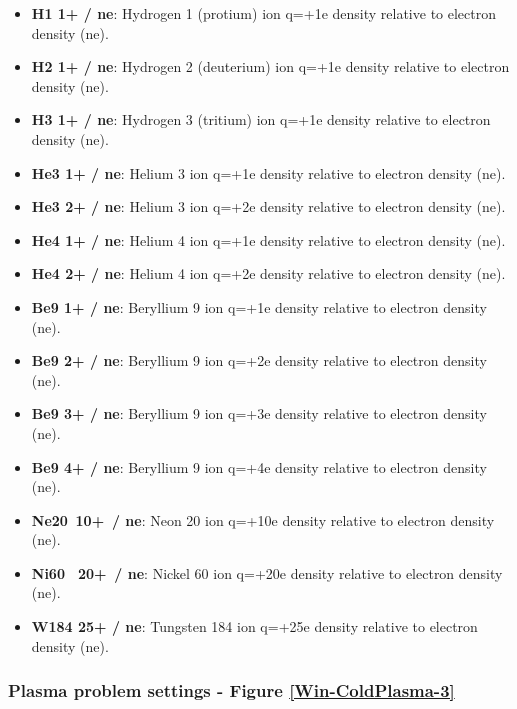 \begin{itemize}\itemsep0em 
	\item \textbf{H1 1+ / ne}: Hydrogen 1 (protium) ion q=+1e density relative to electron density (ne).
	\item \textbf{H2 1+ / ne}: Hydrogen 2 (deuterium) ion q=+1e density relative to electron density (ne).
	\item \textbf{H3 1+ / ne}: Hydrogen 3 (tritium) ion q=+1e density relative to electron density (ne).
	\\
	\item \textbf{He3 1+ / ne}: Helium 3 ion q=+1e density relative to electron density (ne).
    \item \textbf{He3 2+ / ne}: Helium 3 ion q=+2e density relative to electron density (ne).
    \\
    \item \textbf{He4 1+ / ne}: Helium 4 ion q=+1e density relative to electron density (ne).
    \item \textbf{He4 2+ / ne}: Helium 4 ion q=+2e density relative to electron density (ne).
    \\
	\item \textbf{Be9 1+ / ne}: Beryllium 9 ion q=+1e density relative to electron density (ne).
    \item \textbf{Be9 2+ / ne}: Beryllium 9 ion q=+2e density relative to electron density (ne).
    \item \textbf{Be9 3+ / ne}: Beryllium 9 ion q=+3e density relative to electron density (ne).
    \item \textbf{Be9 4+ / ne}: Beryllium 9 ion q=+4e density relative to electron density (ne).
    \\
	\item \textbf{Ne20 \,10+ \,/ ne}: Neon 20 ion q=+10e density relative to electron density (ne).
    \item \textbf{Ni60 \, 20+ \,/ ne}: Nickel 60 ion q=+20e density relative to electron density (ne).
    \item \textbf{W184 25+ / ne}: Tungsten 184 ion q=+25e density relative to electron density (ne).
\end{itemize}

\subsubsection{Plasma problem settings - Figure \ref{Win-ColdPlasma-3}}\label{ColdPlasmaSettings}

